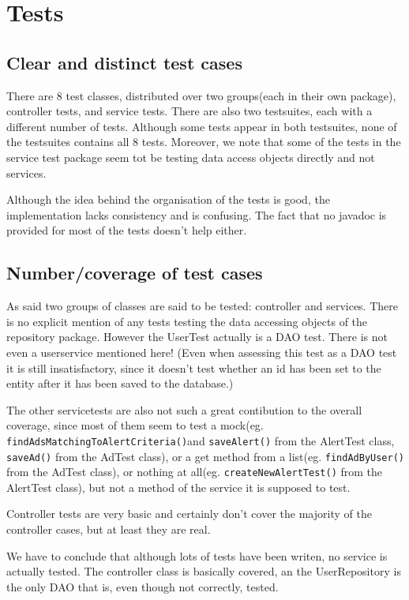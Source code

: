 \documentclass[a4wide]{article}
\begin{document}
\section{Tests}
\subsection{Clear and distinct test cases}
There are 8 test classes, distributed over two groups(each in their own package), controller tests, and service tests. There are also two testsuites, each with a different number of tests. Although some tests appear in both testsuites, none of the testsuites contains all 8 tests. Moreover, we note that some of the tests in the service test package seem tot be testing data access objects directly and not services. 

Although the idea behind the organisation of the tests is good, the implementation lacks consistency and is confusing. The fact that no javadoc is provided for most of the tests doesn't help either. 
\subsection{Number/coverage of test cases}
As said two groups of classes are said to be tested: controller and services. There is no explicit mention of any tests testing the data accessing objects of the repository package. However the UserTest actually is a DAO test. There is not even a userservice mentioned here! (Even when assessing this test as a DAO test it is still insatisfactory, since it doesn't test whether an id has been set to the entity after it has been saved to the database.)

The other servicetests are also not such a great contibution to the overall coverage, since most of them seem to test a mock(eg. \texttt{findAdsMatchingToAlertCriteria()}and \texttt{saveAlert()} from the AlertTest class, \texttt{saveAd()} from the AdTest class), or a get method from a list(eg. \texttt{findAdByUser()} from the AdTest class), or nothing at all(eg. \texttt{createNewAlertTest()} from the AlertTest class), but not a method of the service it is supposed to test. 

Controller tests are very basic and certainly don't cover the majority of the controller cases, but at least they are real. 

We have to conclude that although lots of tests have been writen, no service is actually tested. The controller class is basically covered, an the UserRepository is the only DAO that is, even though not correctly, tested. 
\end{document}

